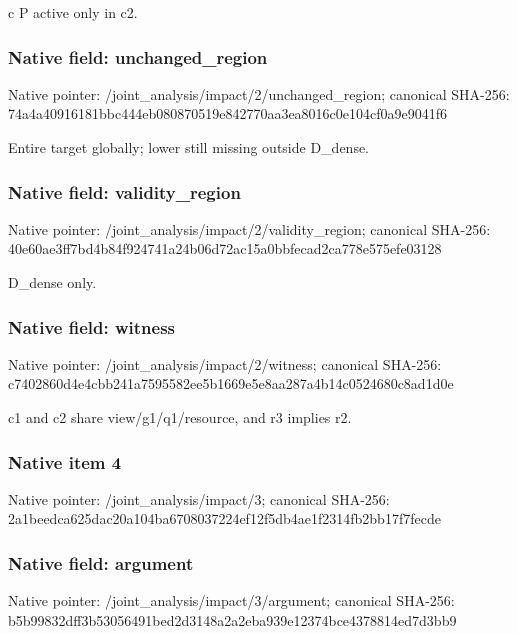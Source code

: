 \documentclass[10pt,a4paper]{article}
\begin{document}
\begingroup\raggedright\sloppy c P active only in c2.\par\endgroup

\subsubsection{Native field: unchanged\_\allowbreak{}region}
Native pointer: /joint\_\allowbreak{}analysis/impact/2/unchanged\_\allowbreak{}region; canonical SHA-256: 74a4a40916181bbc444eb080870519e842770aa3ea8016c0e104cf0a9e9041f6

\begingroup\raggedright\sloppy Entire target globally;\allowbreak{} lower still missing outside D\_\allowbreak{}dense.\par\endgroup

\subsubsection{Native field: validity\_\allowbreak{}region}
Native pointer: /joint\_\allowbreak{}analysis/impact/2/validity\_\allowbreak{}region; canonical SHA-256: 40e60ae3ff7bd4b84f924741a24b06d72ac15a0bbfecad2ca778e575efe03128

\begingroup\raggedright\sloppy D\_\allowbreak{}dense only.\par\endgroup

\subsubsection{Native field: witness}
Native pointer: /joint\_\allowbreak{}analysis/impact/2/witness; canonical SHA-256: c7402860d4e4cbb241a7595582ee5b1669e5e8aa287a4b14c0524680c8ad1d0e

\begingroup\raggedright\sloppy c1 and c2 share view/\allowbreak{}g1/\allowbreak{}q1/\allowbreak{}resource,\allowbreak{} and r3 implies r2.\par\endgroup

\subsubsection{Native item 4}
Native pointer: /joint\_\allowbreak{}analysis/impact/3; canonical SHA-256: 2a1beedca625dac20a104ba6708037224ef12f5db4ae1f2314fb2bb17f7fecde

\subsubsection{Native field: argument}
Native pointer: /joint\_\allowbreak{}analysis/impact/3/argument; canonical SHA-256: b5b99832dff3b53056491bed2d3148a2a2eba939e12374bce4378814ed7d3bb9
\end{document}
